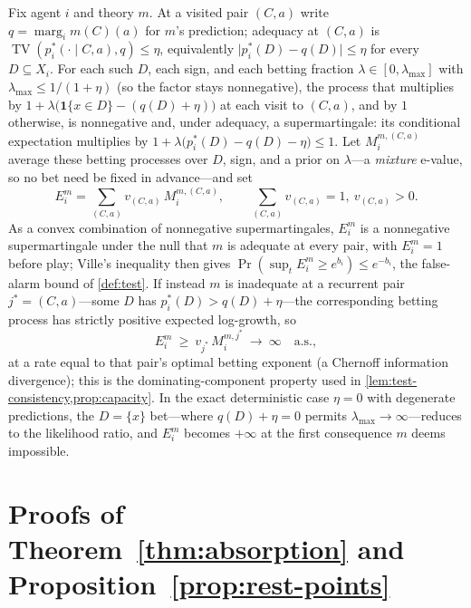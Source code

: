 \documentclass[11pt]{article}
\theoremstyle{definition}
\newcommand{\TV}{\operatorname{TV}}
\newcommand{\marg}[1]{\operatorname{marg}_{#1}}
\begin{document}
Fix agent $i$ and theory $m$.
At a visited pair $(C,a)$ write $q=\marg{i}m(C)(a)$ for $m$'s prediction; adequacy at $(C,a)$ is $\TV(p_i^{*}(\cdot\mid C,a),q)\le\eta$, equivalently $\lvert p_i^{*}(D)-q(D)\rvert\le\eta$ for every $D\subseteq X_i$.
For each such $D$, each sign, and each betting fraction $\lambda\in[0,\lambda_{\max}]$ with $\lambda_{\max}\le1/(1+\eta)$ (so the factor stays nonnegative), the process that multiplies by $1+\lambda\bigl(\mathbf 1\{x\in D\}-(q(D)+\eta)\bigr)$ at each visit to $(C,a)$, and by $1$ otherwise, is nonnegative and, under adequacy, a supermartingale: its conditional expectation multiplies by $1+\lambda\bigl(p_i^{*}(D)-q(D)-\eta\bigr)\le1$.
Let $M_i^{m,(C,a)}$ average these betting processes over $D$, sign, and a prior on $\lambda$---a \emph{mixture} e-value, so no bet need be fixed in advance---and set
\[
E_i^{m}=\sum_{(C,a)}v_{(C,a)}\,M_i^{m,(C,a)},
\qquad
\textstyle\sum_{(C,a)}v_{(C,a)}=1,\ v_{(C,a)}>0.
\]
As a convex combination of nonnegative supermartingales, $E_i^{m}$ is a nonnegative supermartingale under the null that $m$ is adequate at every pair, with $E_i^{m}=1$ before play; Ville's inequality then gives $\Pr(\sup_t E_i^{m}\ge e^{b_i})\le e^{-b_i}$, the false-alarm bound of \cref{def:test}.
If instead $m$ is inadequate at a recurrent pair $j^{*}=(C,a)$---some $D$ has $p_i^{*}(D)>q(D)+\eta$---the corresponding betting process has strictly positive expected log-growth, so
\[
E_i^{m}\ \ge\ v_{j^{*}}\,M_i^{m,j^{*}}\ \longrightarrow\ \infty\quad\text{a.s.},
\]
at a rate equal to that pair's optimal betting exponent (a Chernoff information divergence); this is the dominating-component property used in \cref{lem:test-consistency,prop:capacity}.
In the exact deterministic case $\eta=0$ with degenerate predictions, the $D=\{x\}$ bet---where $q(D)+\eta=0$ permits $\lambda_{\max}\to\infty$---reduces to the likelihood ratio, and $E_i^{m}$ becomes $+\infty$ at the first consequence $m$ deems impossible.

\section{Proofs of Theorem~\ref{thm:absorption} and
Proposition~\ref{prop:rest-points}}
\label{app:absorption}
\end{document}
